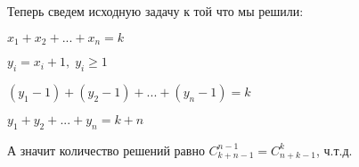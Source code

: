\begin{itemize}
	Теперь сведем исходную задачу к той что мы решили:
	
	$x_1 + x_2 + ... + x_n = k$
	
	$y_i = x_i + 1, \; y_i \geqslant 1$
	
	$(y_1 - 1) + (y_2 - 1) + ... + (y_n - 1) = k$
	
	$y_1 + y_2 + ... + y_n = k + n$
	
	А значит количество решений равно $C^{n-1}_{k+n-1} = C^{k}_{n+k-1}$, ч.т.д.
\end{itemize}